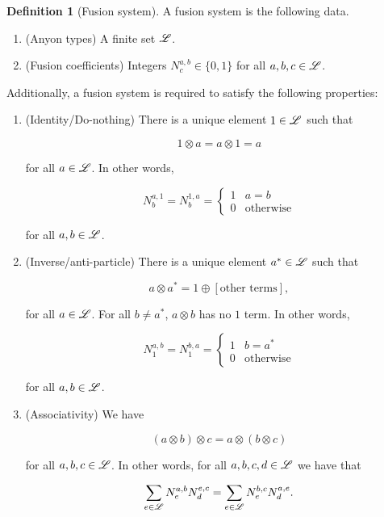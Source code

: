 \documentclass{article}
\theoremstyle{definition}
\newtheorem*{definition}{Definition}
\numberwithin{figure}{section}
\begin{document}
\begin{definition}[Fusion system] A fusion system is the following data.

\begin{enumerate}
\item (Anyon types) A finite set $\mathscr{L}$.
\item (Fusion coefficients) Integers $N_{c}^{a,b}\in\{0,1\}$ for all $a,b,c\in \mathscr{L}$.
\end{enumerate}

Additionally, a fusion system is required to satisfy the following properties:

\begin{enumerate}
\item (Identity/Do-nothing) There is a unique element $1\in \mathscr{L}$ such that

$$1\otimes a=a\otimes 1=a$$

for all $a\in \mathscr{L}$. In other words,

$$N^{a,1}_{b}=N^{1,a}_{b}=\begin{cases}1 & a=b \\ 0 & \text{otherwise}\end{cases}$$

for all $a,b\in \mathscr{L}$.

\item (Inverse/anti-particle) There is a unique element $a^*\in \mathscr{L}$ such that

$$a\otimes a^*=1\oplus [\text{other terms}],$$

for all $a\in \mathscr{L}$. For all  $b\neq a^*$, $a\otimes b$ has no $1$ term. In other words,

$$N^{a,b}_{1}=N^{b,a}_{1}=\begin{cases} 1 & b=a^* \\ 0 & \text{otherwise}\end{cases}$$

for all $a, b\in \mathscr{L}$.

\item (Associativity) We have

$$(a\otimes b)\otimes c=a\otimes (b\otimes c)$$

for all $a,b,c\in \mathscr{L}$. In other words, for all $a,b,c,d\in \mathscr{L}$ we have that

$$\sum_{e\in \mathscr{L}}N_e^{a,b}N_{d}^{e,c}=\sum_{e\in \mathscr{L}}N_{e}^{b,c}N_d^{a,e}.$$
\end{enumerate}

\raggedleft\qedsymbol{}
\end{definition}
\end{document}
